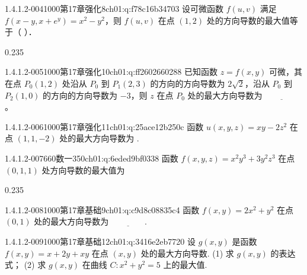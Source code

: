 \begin{q}{1.4.1.2-004}{1000第17章强化8}{ch01:q:f78c16b34703}
设可微函数 $f(u,v)$ 满足 $f(x-y,x+e^y)=x^2-y^2$，则 $f(u,v)$ 在点 $(1,2)$ 处的方向导数的最大值等于（  ）．
\begin{opts}{0.235}
\hfill{}\hfill{}\hfill{}
\end{opts}
\end{q}

\begin{q}{1.4.1.2-005}{1000第17章强化10}{ch01:q:ff2602660288}
已知函数 $z=f(x,y)$ 可微，其在点 $P_0(1,2)$ 处沿从 $P_0$ 到 $P_1(2,3)$ 的方向的方向导数为 $2\sqrt{2}$，沿从 $P_0$ 到 $P_2(1,0)$ 的方向的方向导数为 $-3$，则 $z$ 在点 $P_0$ 处的最大方向导数为 $\underline{\hspace{4em}}$。
\end{q}

\begin{q}{1.4.1.2-006}{1000第17章强化11}{ch01:q:25ace12b250c}
函数 $u(x,y,z)=xy-2z^2$ 在点 $(1,1,-2)$ 处的最大方向导数为 \underline{\hspace{4em}}.
\end{q}

\begin{q}{1.4.1.2-007}{660数一350}{ch01:q:6eded9bf0338}
函数 $f(x,y,z)=x^2y^3+3y^2z^3$ 在点 $(0,1,1)$ 处方向导数的最大值为
\begin{opts}{0.235}
\hfill{}\hfill{}\hfill{}
\end{opts}
\end{q}

\begin{q}{1.4.1.2-008}{1000第17章基础9}{ch01:q:c9d8c08835c4}
函数 $f(x,y)=2x^2+y^2$ 在点 $(0,1)$ 处的最大方向导数为 $\underline{\hspace{4em}}$.
\end{q}

\begin{q}{1.4.1.2-009}{1000第17章基础12}{ch01:q:3416e2eb7720}
设 $g(x,y)$ 是函数 $f(x,y)=x+2y+xy$ 在点 $(x,y)$ 处的最大方向导数.
(1) 求 $g(x,y)$ 的表达式；
(2) 求 $g(x,y)$ 在曲线 $C:x^2+y^2=5$ 上的最大值.
\end{q}

